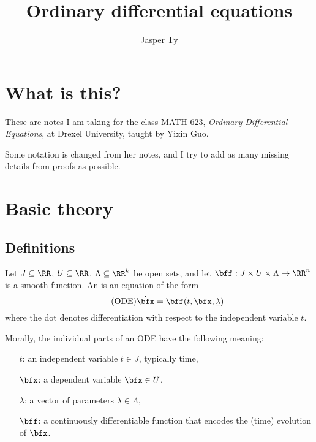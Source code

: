 \documentclass{article}
\title{Ordinary differential equations}
\author{Jasper Ty}
\date{}
\newcommand*\ullam{\underline{\lambda}}
\begin{document}
\maketitle

\section*{What is this?}

These are notes I am taking for the class MATH-623, \textit{Ordinary Differential Equations}, at Drexel University, taught by Yixin Guo.

Some notation is changed from her notes, and I try to add as many missing details from proofs as possible.

\tableofcontents

\newpage

\section{Basic theory}

\subsection{Definitions}

\begin{definition}
    Let $J \subseteq \RR$, $U \subseteq \RR$, $\Lambda \subseteq \RR^k$ be open sets, and let $\bff: J \times U \times \Lambda \to \RR^n$ is a smooth function.
    An  is an equation of the form 
    \begin{equation}
        \label{eqn:ODE}
        \tag{ODE}
        \dot{\bfx}
        =
        \bff(t, \bfx, \ullam)
    \end{equation}
    where the dot denotes differentiation with respect to the independent variable $t$.
\end{definition}

Morally, the individual parts of an ODE have the following meaning:
\begin{itemize}
    \item[$t$:]
        an independent variable $t \in J$, typically time,
    \item [$\bfx$:]
        a dependent variable $\bfx \in U$,
    \item[$\ullam$:]
        a vector of parameters $\ullam \in \Lambda$, 
    \item[$\bff$:]
        a continuously differentiable function that encodes the (time) evolution of $\bfx$.
\end{itemize}
\end{document}
